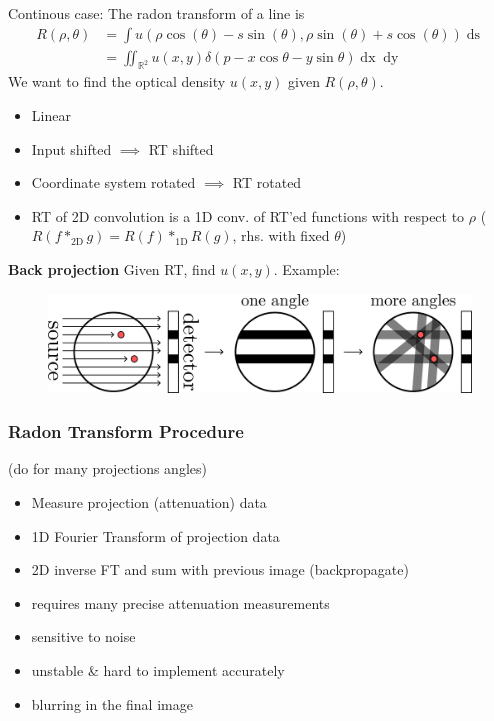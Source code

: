 \documentclass[a4paper,10pt]{article}
\newcommand*\bad{\item[\textcolor{badred}{\(\bm{-}\)}]}
\begin{document}
Continous case: The radon transform of a line is 
\begin{align*}
    R(\rho , \theta) &= \int u(\rho \cos (\theta ) - s \sin (\theta ), \rho \sin (\theta ) + s \cos (\theta )) \mathop{ds} \\&= \iint_{\mathbb{R}^2} u(x,y) \delta (p - x \cos \theta - y \sin \theta ) \mathop{dx} \mathop{dy}
\end{align*}
We want to find the optical density \( u(x,y) \) given \( R(\rho , \theta ) \).

\begin{itemize}
    \item Linear
    \item Input shifted \( \implies \) RT shifted
    \item Coordinate system rotated \( \implies \) RT rotated
    \item RT of 2D convolution is a 1D conv. of RT'ed functions with respect to \( \rho \) (\( R(f*_\text{2D} g) = R(f) *_\text{1D} R(g) \), rhs. with fixed \( \theta  \))
\end{itemize}
\textbf{Back projection} Given RT, find \( u(x,y) \). Example:
\begin{figure}[h]
    \includegraphics[width=\linewidth]{radon-back-projection.png}
\end{figure}

\subsubsection{Radon Transform Procedure} (do for many projections angles)
\begin{itemize}
    \item Measure projection (attenuation) data
    \item 1D Fourier Transform of projection data
    \item 2D inverse FT and sum with previous image (backpropagate)
\end{itemize}
\begin{itemize}
    \bad requires many precise attenuation measurements
    \bad sensitive to noise
    \bad unstable \& hard to implement accurately
    \bad blurring in the final image
\end{itemize}
\end{document}
